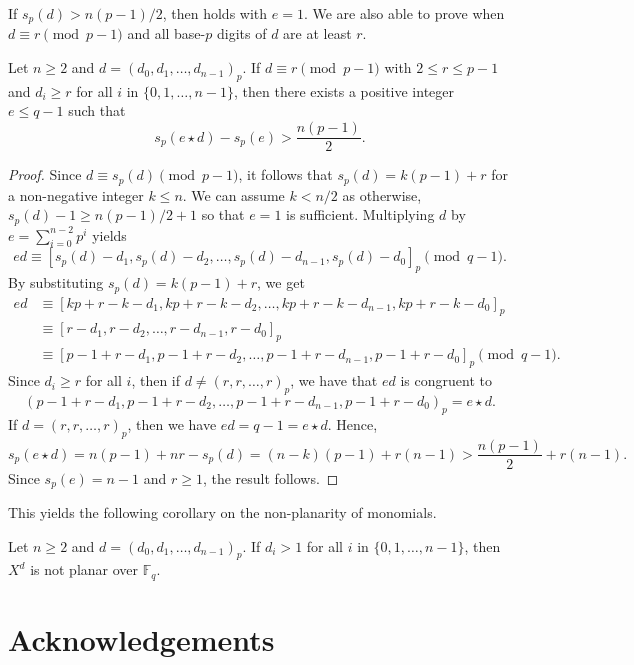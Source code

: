 \documentclass[12pt]{article}
\newcommand{\F}{\mathbb{F}}
\newcommand{\wt}{s_p}
\begin{document}
If $s_p(d) > n(p - 1)/2$, then  holds with $e = 1$.
We are also able to prove  when $d \equiv r \pmod{p - 1}$ and all base-$p$ digits of $d$ are at least $r$.

\begin{lemma}
Let $n \geq 2$ and $d = (d_0,d_1,\dots,d_{n-1})_p$. If $d \equiv r \pmod{p - 1}$ with $2 \leq r \leq p - 1$ and $d_i \geq r$ for all $i$ in $\{0, 1, \ldots, n-1\}$, then there exists a positive integer $e \leq q - 1$ such that \[\wt(e \star d) - \wt(e) > \frac{n(p-1)}{2}.\]
\end{lemma}
\begin{proof}
Since $d \equiv \wt(d) \pmod{p-1}$, it follows that $\wt(d) = k(p-1) + r$ for a non-negative integer $k \leq n$. We can assume $k < n / 2$ as otherwise, $\wt(d) - 1 \geq n(p-1)/2 + 1$ so that $e = 1$ is sufficient. Multiplying $d$ by $e = \sum_{i=0}^{n-2} p^i$ yields
    \[ed \equiv [\wt(d) -d_1, \wt(d) - d_2, \dots, \wt(d) - d_{n-1},\wt(d) - d_{0}]_p \pmod {q-1}.\]
By substituting $\wt(d) = k(p - 1) + r$, we get 
    \begin{align*}
    ed &\equiv [kp+r-k -d_1, kp+r-k - d_2, \dots, kp+r-k - d_{n-1},kp+r-k - d_{0}]_p \\
    &\equiv [r -d_1, r - d_2, \dots, r - d_{n-1},r - d_{0}]_p \\
    &\equiv [p-1+r -d_1, p-1+r - d_2, \dots, p-1+r - d_{n-1},p-1+r - d_{0}]_p \pmod{q-1}.
    \end{align*}
Since $d_i\geq r$ for all $i$, then if $d \neq (r, r, \ldots, r)_p$, we have that $ed$ is congruent to
    \[(p-1+r -d_1, p-1+r - d_2, \dots, p-1+r - d_{n-1},p-1+r - d_{0})_p = e \star d.\]
If $d = (r,r,\dots,r)_p$, then we have $ed = q-1 = e \star d$.
Hence,
\begin{equation*}
\wt(e \star d) = n(p-1) + nr- \wt(d) = (n-k)(p-1) +r(n-1) > \frac{n(p-1)}{2} + r(n-1).
\end{equation*}
Since $\wt(e) = n-1$ and $r\geq 1$, the result follows. 
\end{proof}

This yields the following corollary on the non-planarity of monomials.
\begin{corollary}
Let $n\geq 2$ and $d = (d_0,d_1,\dots,d_{n-1})_p$. If $d_i > 1$ for all $i$ in $\{0, 1, \ldots, n-1\}$, then $X^d$ is not planar over $\F_{q}$.
\end{corollary}


\section*{Acknowledgements}
\end{document}
